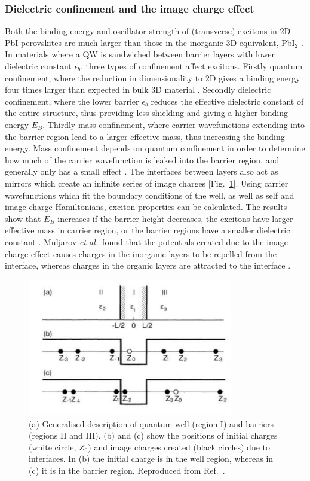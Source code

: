 \subsubsection{Dielectric confinement and the image charge effect}

Both the binding energy and oscillator strength of (transverse) excitons in 2D PbI perovskites are much larger than those in the inorganic 3D equivalent, Pb$\textrm{I}_2$ \cite{Hirasawa1994}. In materials where a QW is sandwiched between barrier layers with lower dielectric constant $\epsilon_b$, three types of confinement affect excitons. Firstly quantum confinement, where the reduction in dimensionality to 2D gives a binding energy four times larger than expected in bulk 3D material \cite{Shinada1966}. Secondly dielectric confinement, where the lower barrier $\epsilon_b$ reduces the effective dielectric constant of the entire structure, thus providing less shielding and giving a higher binding energy $E_B$. Thirdly mass confinement, where carrier wavefunctions extending into the barrier region lead to a larger effective mass, thus increasing the binding energy. Mass confinement depends on quantum confinement in order to determine how much of the carrier wavefunction is leaked into the barrier region, and generally only has a small effect \cite{Kumagai1989}. The interfaces between layers also act as mirrors which create an infinite series of image charges [Fig.\ \ref{2Fig17}]. Using carrier wavefunctions which fit the boundary conditions of the well, as well as self and image-charge Hamiltonians, exciton properties can be calculated. The results show that $E_B$ increases if the barrier height decreases, the excitons have larger effective mass in carrier region, or the barrier regions have a smaller dielectric constant \cite{Kumagai1989}. Muljarov \textit{et al.}\ found that the potentials created due to the image charge effect causes charges in the inorganic layers to be repelled from the interface, whereas charges in the organic layers are attracted to the interface \cite{Muljarov1995}.
\begin{figure}[h!]
\centering
\includegraphics[width=0.8\textwidth]{Fig17}
\caption{(a) Generalised description of quantum well (region I) and barriers (regions II and III). (b) and (c) show the positions of initial charges (white circle, $Z_0$) and image charges created (black circles) due to interfaces. In (b) the initial charge is in the well region, whereas in (c) it is in the barrier region. Reproduced from Ref.\ \cite{Kumagai1989}.}
\label{2Fig17}
\end{figure}

